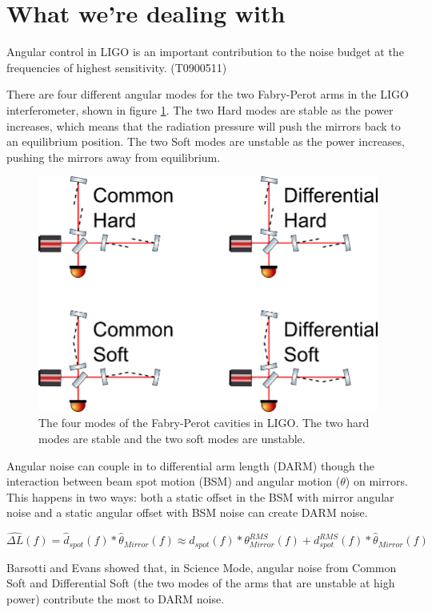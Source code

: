 \section{What we're dealing with}
Angular control in LIGO is an important contribution to the noise budget at the frequencies of highest sensitivity. (T0900511)

There are four different angular modes for the two Fabry-Perot arms in the LIGO interferometer, shown in figure \ref{fig:sidlessiggmodes}. 
The two Hard modes are stable as the power increases, which means that the radiation pressure will push the mirrors back to an equilibrium position.
The two Soft modes are unstable as the power increases, pushing the mirrors away from equilibrium.

\begin{figure}[htp]%
\includegraphics[width=.8\textwidth]{figures/application/SidlesSigg}%
\caption[Sidles-Sigg Modes]{The four modes of the Fabry-Perot cavities in LIGO. The two hard modes are stable and the two soft modes are unstable.}%
\label{fig:sidlessiggmodes}%
\end{figure}

Angular noise can couple in to differential arm length (DARM) though the interaction between beam spot motion (BSM) and angular motion ($\theta$) on mirrors. This happens in two ways: both a static offset in the BSM with mirror angular noise and a static angular offset with BSM noise can create DARM noise. 

\begin{equation}
\hat{\Delta L}(f) = \hat{d}_{spot}(f)*\hat{\theta}_{Mirror}(f) \approx \hat{d}_{spot}(f)*\theta_{Mirror}^{RMS}(f) + d_{spot}^{RMS}(f)*\hat{\theta}_{Mirror}(f)
\label{eq:darmcouple}
\end{equation}

Barsotti and Evans showed that, in Science Mode, angular noise from Common Soft and Differential Soft (the two modes of the arms that are unstable at high power) contribute the most to DARM noise.

